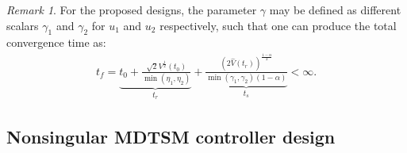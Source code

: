 \documentclass[3p]{elsarticle}
\theoremstyle{plain}
\theoremstyle{remark}
\newtheorem{myrem}{Remark}
\begin{document}
\begin{myrem}
For the proposed designs, the parameter $\gamma$ may be defined as different scalars $\gamma_1$ and $\gamma_2$ for $u_1$ and $u_2$ respectively, such that one can produce the total convergence time as:
\begin{align}
t_f = \underbrace{t_0+\frac{\sqrt{2}V^{\frac{1}{2}}(t_0)}{\min(\eta_1,\eta_2)}}_{t_r}+\underbrace{\frac{(2\hat V(t_r))^{\frac{1-\alpha}{2}}}{\min(\gamma_1,\gamma_2)(1-\alpha)}}_{t_s}<\infty.\label{eq:normal total convergence time}
\end{align}
\end{myrem}
\subsection{Nonsingular MDTSM controller design}
\end{document}
